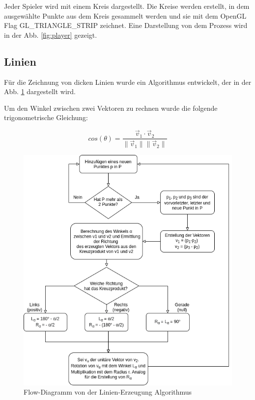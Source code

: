 \documentclass[doktyp=studarbeit]{TUBAFarbeiten}
\begin{document}
Jeder Spieler wird mit einem Kreis dargestellt. Die Kreise werden erstellt, in
dem ausgewählte Punkte aus dem Kreis gesammelt werden und sie mit dem 
OpenGL Flag GL\_TRIANGLE\_STRIP zeichnet. Eine Darstellung von dem Prozess
wird in der Abb. \ref{fig:player} gezeigt.

\FloatBarrier
\subsection{Linien}

Für die Zeichnung von dicken Linien wurde ein Algorithmus entwickelt, der
in der Abb. \ref{fig:line-alg} dargestellt wird. 

Um den Winkel zwischen zwei Vektoren zu rechnen wurde die folgende 
trigonometrische Gleichung:

\begin{equation}
    cos(\theta)=
    \frac{\vec{v}_{1} \cdot \vec{v}_{2}}{
        \lVert \vec{v}_{1} \rVert 
        \lVert \vec{v}_{2} \rVert
    }
\end{equation}

\begin{figure}[!htb]
    \centering
    \includegraphics[width=0.7\linewidth]{line.png}
    \caption{Flow-Diagramm von der Linien-Erzeugung Algorithmus}
    \label{fig:line-alg}
\end{figure}
\end{document}
